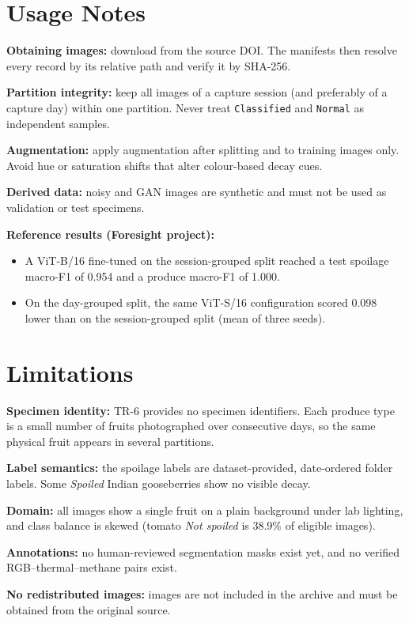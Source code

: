 \documentclass[journal]{IEEEtran}
\begin{document}
\section{Usage Notes}
\textbf{Obtaining images:} download  from the source DOI. The manifests then resolve every record by its relative path and verify it by SHA-256.

\textbf{Partition integrity:} keep all images of a capture session (and preferably of a capture day) within one partition. Never treat \texttt{Classified} and \texttt{Normal} as independent samples.

\textbf{Augmentation:} apply augmentation after splitting and to training images only. Avoid hue or saturation shifts that alter colour-based decay cues.

\textbf{Derived data:} noisy and GAN images are synthetic and must not be used as validation or test specimens.

\textbf{Reference results (Foresight project):}
\begin{itemize}
  \item A ViT-B/16 fine-tuned on the session-grouped split reached a test spoilage macro-F1 of 0.954 and a produce macro-F1 of 1.000.
  \item On the day-grouped split, the same ViT-S/16 configuration scored 0.098 lower than on the session-grouped split (mean of three seeds).
\end{itemize}

\section{Limitations}
\textbf{Specimen identity:} TR-6 provides no specimen identifiers. Each produce type is a small number of fruits photographed over consecutive days, so the same physical fruit appears in several partitions.

\textbf{Label semantics:} the spoilage labels are dataset-provided, date-ordered folder labels. Some \emph{Spoiled} Indian gooseberries show no visible decay.

\textbf{Domain:} all images show a single fruit on a plain background under lab lighting, and class balance is skewed (tomato \emph{Not spoiled} is 38.9\% of eligible images).

\textbf{Annotations:} no human-reviewed segmentation masks exist yet, and no verified RGB--thermal--methane pairs exist.

\textbf{No redistributed images:} images are not included in the archive and must be obtained from the original source.
\end{document}
